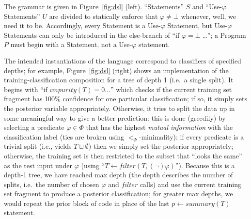 The grammar is given in Figure~\ref{fig:dsl} (left).
``Statements'' $S$ and ``Use-$\varphi$ Statements'' $U$ are divided
to statically enforce that $\varphi \neq \bot$ whenever, well,
we need it to be.
Accordingly, every Statement is a Use-$\varphi$ Statement,
but Use-$\varphi$ Statements can only be introduced in the else-branch
of ``if $\varphi = \bot$ \ldots'';
a Program $P$ must begin with a Statement,
not a Use-$\varphi$ statement.

The intended instantiations of the language correspond
to classifiers of specified depths;
for example, Figure~\ref{fig:dsl} (right) shows an implementation of
the training-classification composition for a tree of depth 1
(i.e.\ a single split).
It begins with ``if $\mathit{impurity}(T) = 0 \ldots$''
which checks if the current training set fragment has 100\% confidence
for one particular classification;
if so, it simply sets the posterior variable appropriately.
Otherwise, it tries to split the data up in some meaningful way
to give a better prediction:
this is done (greedily) by selecting a predicate $\varphi \in \Phi$
that has the highest \emph{mutual information} with the classification label
(ties are broken using $<_\Phi$-minimality):
if every predicate is a trivial split (i.e., yields $T \sqcup \emptyset$)
then we simply set the posterior appropriately;
otherwise, the training set is then restricted to the subset
that ``looks the same'' as the test input under $\varphi$
(using ``$T \gets \mathit{filter}(T, (\lnot)\varphi)$'').
Because this is a depth-1 tree, we have reached max depth
(the depth describes the number of splits, i.e.\ the number of
chosen $\varphi$ and $\mathit{filter}$ calls)
and use the current training set fragment to produce a posterior classification;
for greater max depths, we would repeat the prior block of code
in place of the last $p \gets \mathit{summary}(T)$ statement.
